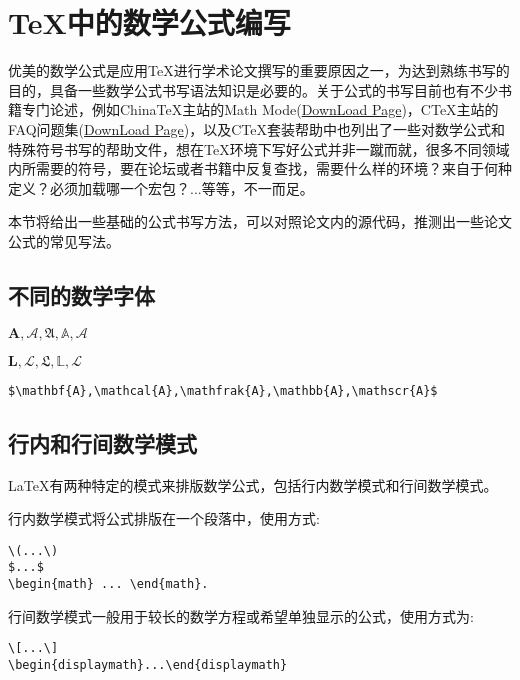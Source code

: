 
\chapter{\TeX{}中的数学公式编写}\label{chap03}
优美的数学公式是应用\TeX{}进行学术论文撰写的重要原因之一，为达到熟练书写的目的，具备一些数学公式书写语法知识是必要的。关于公式的书写目前也有不少书籍专门论述，例如China\TeX{}主站的Math Mode(\href{http://www.math.ecnu.edu.cn/~latex/docs/Eng_doc/TheLatexCompanionCh8.pdf}{DownLoad Page})，C\TeX{}主站的FAQ问题集(\href{http://www.ctex.org/CTeXFAQ}{DownLoad Page})，以及C\TeX{}套装帮助中也列出了一些对数学公式和特殊符号书写的帮助文件，想在\TeX{}环境下写好公式并非一蹴而就，很多不同领域内所需要的符号，要在论坛或者书籍中反复查找，需要什么样的环境？来自于何种定义？必须加载哪一个宏包？...等等，不一而足。

本节将给出一些基础的公式书写方法，可以对照论文内的源代码，推测出一些论文公式的常见写法。

\section{不同的数学字体}

$\mathbf{A},\mathcal{A},\mathfrak{A},\mathbb{A},\mathscr{A}$

$\mathbf{L},\mathcal{L},\mathfrak{L},\mathbb{L},\mathscr{L}$

\begin{lstlisting}
$\mathbf{A},\mathcal{A},\mathfrak{A},\mathbb{A},\mathscr{A}$
\end{lstlisting}

\section{行内和行间数学模式}
\LaTeX{}有两种特定的模式来排版数学公式，包括行内数学模式和行间数学模式。

行内数学模式将公式排版在一个段落中，使用方式:
\begin{lstlisting}
\(...\)
$...$
\begin{math} ... \end{math}.
\end{lstlisting}

行间数学模式一般用于较长的数学方程或希望单独显示的公式，使用方式为:
\begin{lstlisting}
\[...\]
\begin{displaymath}...\end{displaymath}
\end{lstlisting}

